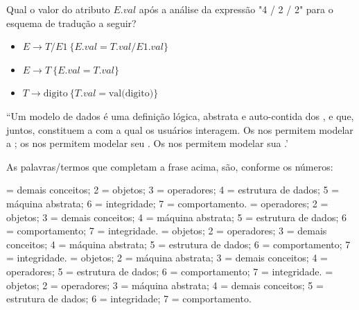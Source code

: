 \documentclass[12pt, addpoints]{exam}
\begin{document}
\begin{questions}
\question
Qual o valor do atributo \( E.val \) após a análise da expressão "4 / 2 / 2" para o esquema de tradução a seguir?

\begin{itemize}
    \item \( E \rightarrow T / E1 \ \{ E.val = T.val / E1.val \} \)
    \item \( E \rightarrow T \ \{ E.val = T.val \} \)
    \item \( T \rightarrow \text{digito} \ \{ T.val = \text{val(digito)} \} \)
\end{itemize}

\begin{choices}
\end{choices}

\question
``Um modelo de dados é uma definição lógica, abstrata e auto-contida
dos ,  e  que, juntos, constituem a 
com a qual os usuários interagem. Os  nos permitem modelar
a ; os  nos permitem modelar
seu . Os  nos permitem modelar sua .'

As palavras/termos que completam a frase acima, são, conforme os números:

\begin{choices}
 = demais conceitos; 2 = objetos; 3 = operadores; 4 = estrutura de dados; 5 = máquina abstrata; 6 = integridade; 7 = comportamento.
 = operadores; 2 = objetos; 3 = demais conceitos; 4 = máquina abstrata; 5 = estrutura de dados; 6 = comportamento; 7 = integridade.
 = objetos; 2 = operadores; 3 = demais conceitos; 4 = máquina abstrata; 5 = estrutura de dados; 6 = comportamento; 7 = integridade.
 = objetos; 2 = máquina abstrata; 3 = demais conceitos; 4 = operadores; 5 = estrutura de dados; 6 = comportamento; 7 = integridade.
 = objetos; 2 = operadores; 3 = máquina abstrata; 4 = demais conceitos; 5 = estrutura de dados; 6 = integridade; 7 = comportamento.
\end{choices}



    \end{questions}
    
\end{document}

